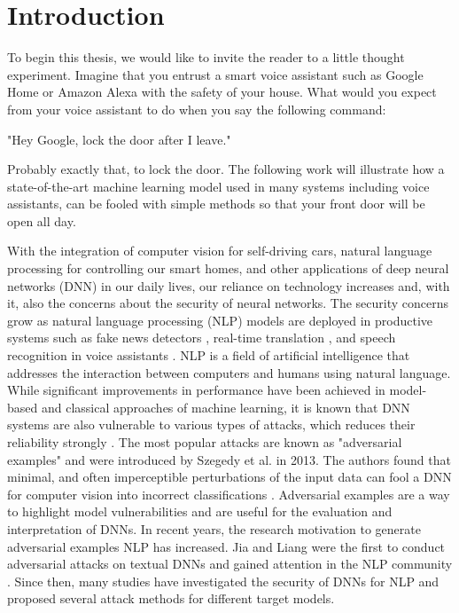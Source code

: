 
\section{Introduction}

To begin this thesis, we would like to invite the reader to a little thought experiment. Imagine that you entrust a smart voice assistant such as Google Home or Amazon Alexa with the safety of your house. What would you expect from your voice assistant to do when you say the following command:

"Hey Google, lock the door after I leave."

Probably exactly that, to lock the door. The following work will illustrate how a state-of-the-art machine learning model used in many systems including voice assistants, can be fooled with simple methods so that your front door will be open all day. 

With the integration of computer vision for self-driving cars, natural language processing for controlling our smart homes, and other applications of deep neural networks (DNN) in our daily lives, our reliance on technology increases and, with it, also the concerns about the security of neural networks. The security concerns grow as natural language processing (NLP) models are deployed in productive systems such as fake news detectors \cite{singhania20173han}, real-time translation \cite{zhang2015deep}, and speech recognition in voice assistants \cite{deng2013new}. NLP is a field of artificial intelligence that addresses the interaction between computers and humans using natural language.  
While significant improvements in performance have been achieved in model-based and classical approaches of machine learning, it is known that DNN systems are also vulnerable to various types of attacks, which reduces their reliability strongly \cite{papernot2018sok}. The most popular attacks are known as "adversarial examples" and were introduced by Szegedy et al. in 2013. The authors found that minimal, and often imperceptible perturbations of the input data can fool a DNN for computer vision into incorrect classifications \cite{szegedy2013intriguing}.
Adversarial examples are a way to highlight model vulnerabilities and are useful for the evaluation and interpretation of DNNs. 
In recent years, the research motivation to generate adversarial examples NLP has increased. Jia and Liang were the first to conduct adversarial attacks on textual DNNs and gained attention in the NLP community \cite{Jia2017AdversarialEF}. Since then, many studies have investigated the security of DNNs for NLP and proposed several attack methods for different target models. 

